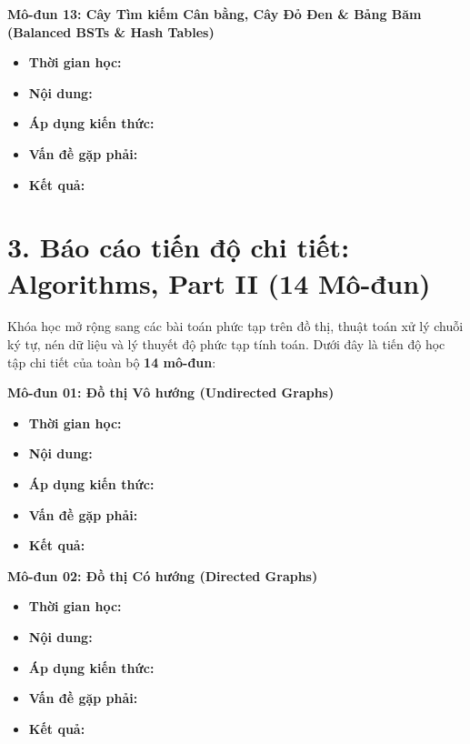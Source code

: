 \documentclass[11pt, a4paper]{article}
\begin{document}
\vspace{0.15cm}

\noindent\textbf{Mô-đun 13: Cây Tìm kiếm Cân bằng, Cây Đỏ Đen \& Bảng Băm (Balanced BSTs \& Hash Tables)}
\begin{itemize}
    \item \textbf{Thời gian học:} 
    \item \textbf{Nội dung:} 
    \item \textbf{Áp dụng kiến thức:} 
    \item \textbf{Vấn đề gặp phải:} 
    \item \textbf{Kết quả:} 
\end{itemize}

\vspace{0.5cm}

\section*{\color{primary}3. Báo cáo tiến độ chi tiết: Algorithms, Part II (14 Mô-đun)}
\vspace{-0.2cm}
Khóa học mở rộng sang các bài toán phức tạp trên đồ thị, thuật toán xử lý chuỗi ký tự, nén dữ liệu và lý thuyết độ phức tạp tính toán. Dưới đây là tiến độ học tập chi tiết của toàn bộ \textbf{14 mô-đun}:

\vspace{0.2cm}

\noindent\textbf{Mô-đun 01: Đồ thị Vô hướng (Undirected Graphs)}
\begin{itemize}
    \item \textbf{Thời gian học:} 
    \item \textbf{Nội dung:} 
    \item \textbf{Áp dụng kiến thức:} 
    \item \textbf{Vấn đề gặp phải:} 
    \item \textbf{Kết quả:} 
\end{itemize}

\vspace{0.15cm}

\noindent\textbf{Mô-đun 02: Đồ thị Có hướng (Directed Graphs)}
\begin{itemize}
    \item \textbf{Thời gian học:} 
    \item \textbf{Nội dung:} 
    \item \textbf{Áp dụng kiến thức:} 
    \item \textbf{Vấn đề gặp phải:} 
    \item \textbf{Kết quả:} 
\end{itemize}
\end{document}
